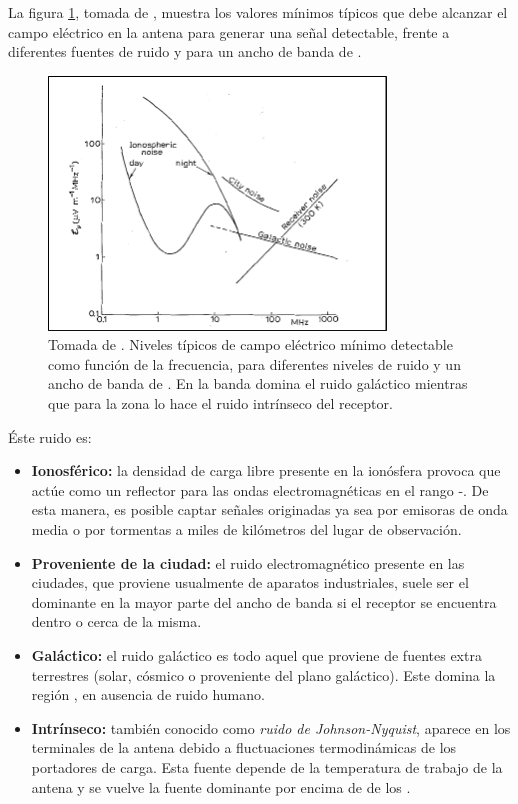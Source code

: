 	La figura \ref{fig:allanNoise}, tomada de \cite{allan1971}, muestra los valores m\'inimos t\'ipicos que debe alcanzar el campo el\'ectrico en la antena para generar una se\~nal detectable, frente a diferentes fuentes de ruido y para un ancho de banda de .
	\begin{figure}[ht!]
		\centering
		\includegraphics[width=0.8\textwidth]{./fig/simulacionRadio/allanNoise}
		\caption{\label{fig:allanNoise}
		Tomada de \cite{allan1971}. Niveles t\'ipicos de campo el\'ectrico m\'inimo detectable como funci\'on de la frecuencia, para diferentes niveles de ruido y un ancho de banda de .
		En la banda  domina el ruido gal\'actico mientras que para la zona  lo hace el ruido intr\'inseco del receptor.
		}
	\end{figure}
	\'Este ruido es:
	\begin{itemize}
	 \item \textbf{Ionosf\'erico:} la densidad de carga libre presente en la ion\'osfera provoca que act\'ue como un reflector para las ondas electromagn\'eticas en el rango -. De esta manera, es posible captar se\~nales originadas ya sea por emisoras de onda media o por tormentas a miles de kil\'ometros del lugar de observaci\'on.
	 \item \textbf{Proveniente de la ciudad:} el ruido electromagn\'etico presente en las ciudades, que proviene usualmente de aparatos industriales, suele ser el dominante en la mayor parte del ancho de banda si el receptor se encuentra dentro o cerca de la misma.
	 \item \textbf{Gal\'actico:} el ruido gal\'actico es todo aquel que proviene de fuentes extra terrestres (solar, c\'osmico o proveniente del plano gal\'actico). Este domina la regi\'on , en ausencia de ruido humano.
	 \item \textbf{Intr\'inseco:} tambi\'en conocido como \emph{ruido de Johnson-Nyquist}, aparece en los terminales de la antena debido a fluctuaciones termodin\'amicas de los portadores de carga. Esta fuente depende de la temperatura de trabajo de la antena y se vuelve la fuente dominante por encima de de los .
	\end{itemize}
	
